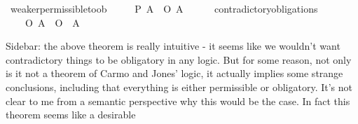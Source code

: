 \begin{isabellebody}
{}\isanewline
%
%
\endisatagproof
{\isafoldproof}%
%
\isadelimproof
\isanewline
%
\endisadelimproof
\isanewline
{}\isamarkupfalse%
\ weaker{\isacharunderscore}permissible{\isacharunderscore}to{\isacharunderscore}ob{\isacharcolon}\isanewline
\ \ \ {\isachardoublequoteopen}{\isasymTurnstile}\ {\isacharparenleft}{\isacharparenleft}{\isasymdiamond}\ {\isacharparenleft}P\ A{\isacharparenright}{\isacharparenright}\ \isactrlbold {\isasymrightarrow}\ O\ {\isacharbraceleft}A{\isacharbraceright}{\isacharparenright}{\isachardoublequoteclose}\isanewline
%
\isadelimproof
\ \ \ \ %
\endisadelimproof
%
\isatagproof
{}\isamarkupfalse%
\isanewline
%
\isanewline
%
\isanewline
%
%
\endisatagproof
{\isafoldproof}%
%
\isadelimproof
\isanewline
%
\endisadelimproof
\isanewline
{}\isamarkupfalse%
\ contradictory{\isacharunderscore}obligations{\isacharcolon}\isanewline
\ \ \ {\isachardoublequoteopen}{\isasymTurnstile}{\isacharparenleft}\isactrlbold {\isasymnot}\ {\isacharparenleft}{\isacharparenleft}O\ {\isacharbraceleft}A{\isacharbraceright}{\isacharparenright}\ \isactrlbold {\isasymand}\ {\isacharparenleft}O\ {\isacharbraceleft}\isactrlbold {\isasymnot}\ A{\isacharbraceright}{\isacharparenright}{\isacharparenright}{\isacharparenright}{\isachardoublequoteclose}\isanewline
%
\isadelimproof
\ \ %
\endisadelimproof
%
\isatagproof
{}\isamarkupfalse%
\isanewline
%
\isanewline
%
\isanewline
%
\isanewline
%
%
\endisatagproof
{\isafoldproof}%
%
\isadelimproof
%
\endisadelimproof
%
\begin{isamarkuptext}%
Sidebar: the above theorem is really intuitive - it seems like we wouldn't want 
contradictory things to be obligatory in any logic. But for some reason, not only is it not
a theorem of Carmo and Jones' logic, it actually implies some strange conclusions, including 
that everything is either permissible or obligatory. It's not clear to me from a semantic 
perspective why this would be the case. In fact this theorem seems like a desirable 

\end{isamarkuptext}
\end{isabellebody}
